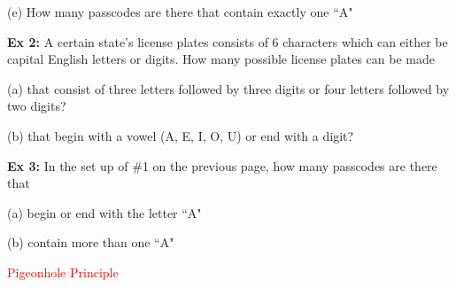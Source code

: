 \documentclass[fleqn]{article}
\newcommand{\red}[1]{\textcolor{red}{#1}}
\theoremstyle{definition}
\begin{document}
\vspace{5.5cm} 
(e)  How many passcodes are there that contain exactly one ``A"


\vspace{4cm} 




\newpage 





\textbf{Ex 2:} A certain state's license plates consists of 6 characters which can either be capital English letters or digits. How many possible license plates can be made

\vspace{.25cm} 
(a) that consist of three letters followed by three digits or four letters followed by two digits? 

\vspace{5cm}




(b) that begin with a vowel (A, E, I, O, U) or end with a digit?



\vspace{5cm}



\textbf{Ex 3:} In the set up of \#1 on the previous page, how many passcodes are there that 

\vspace{.25cm}
(a) begin or end with the letter ``A"

\vspace{5cm}
(b) contain more than one ``A"



\newpage


\red{Pigeonhole Principle} 

\noindent{}
\end{document}
